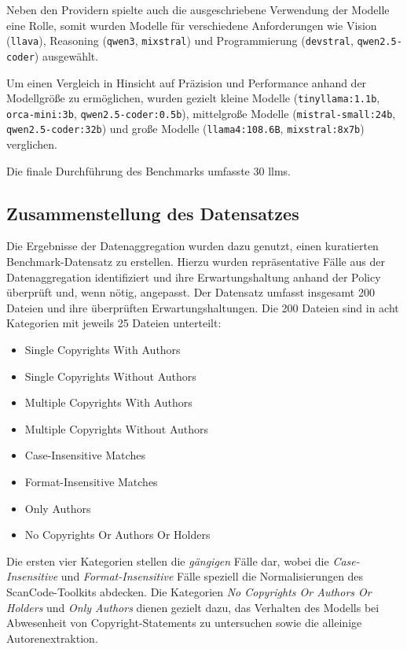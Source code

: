 Neben den Providern spielte auch die ausgeschriebene Verwendung der Modelle eine Rolle, somit wurden Modelle für verschiedene Anforderungen wie Vision (\texttt{llava}), Reasoning (\texttt{qwen3}, \texttt{mixstral}) und Programmierung (\texttt{devstral}, \texttt{qwen2.5-coder}) ausgewählt.

Um einen Vergleich in Hinsicht auf Präzision und Performance anhand der Modellgröße zu ermöglichen, wurden gezielt kleine Modelle (\texttt{tinyllama:1.1b}, \texttt{orca-mini:3b}, \texttt{qwen2.5-coder:0.5b}), mittelgroße Modelle (\texttt{mistral-small:24b}, \texttt{qwen2.5-coder:32b}) und große Modelle (\texttt{llama4:108.6B}, \texttt{mixstral:8x7b}) verglichen.

Die finale Durchführung des Benchmarks umfasste \num{30} \glspl{llm}.


\subsection{Zusammenstellung des Datensatzes}\label{sec:datensatz-benchmark}

Die Ergebnisse der Datenaggregation wurden dazu genutzt, einen kuratierten Benchmark-Datensatz zu erstellen.
Hierzu wurden repräsentative Fälle aus der Datenaggregation identifiziert und ihre Erwartungshaltung anhand der Policy überprüft und, wenn nötig, angepasst.
Der Datensatz umfasst insgesamt \num{200} Dateien und ihre überprüften Erwartungshaltungen.
Die \num{200} Dateien sind in acht Kategorien mit jeweils \num{25} Dateien unterteilt:

\begin{itemize}
    \item Single Copyrights With Authors
    \item Single Copyrights Without Authors
    \item Multiple Copyrights With Authors
    \item Multiple Copyrights Without Authors
    \item Case-Insensitive Matches
    \item Format-Insensitive Matches
    \item Only Authors
    \item No Copyrights Or Authors Or Holders
\end{itemize}

Die ersten vier Kategorien stellen die \textit{gängigen} Fälle dar, wobei die \textit{Case-Insensitive} und \textit{Format-Insensitive} Fälle speziell die Normalisierungen des ScanCode-Toolkits abdecken.
Die Kategorien \textit{No Copyrights Or Authors Or Holders} und \textit{Only Authors} dienen gezielt dazu, das Verhalten des Modells bei Abwesenheit von Copyright-Statements zu untersuchen sowie die alleinige Autorenextraktion.

